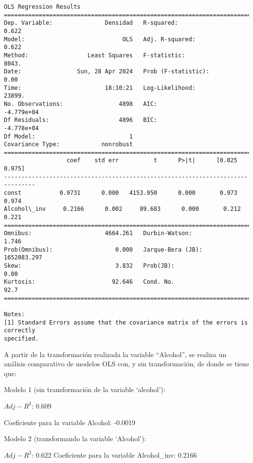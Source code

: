 \documentclass[11pt]{article}
\begin{document}
    \begin{Verbatim}[commandchars=\\\{\}]
                            OLS Regression Results
==============================================================================
Dep. Variable:               Densidad   R-squared:                       0.622
Model:                            OLS   Adj. R-squared:                  0.622
Method:                 Least Squares   F-statistic:                     8043.
Date:                Sun, 28 Apr 2024   Prob (F-statistic):               0.00
Time:                        18:10:21   Log-Likelihood:                 23899.
No. Observations:                4898   AIC:                        -4.779e+04
Df Residuals:                    4896   BIC:                        -4.778e+04
Df Model:                           1
Covariance Type:            nonrobust
===============================================================================
                  coef    std err          t      P>|t|      [0.025      0.975]
-------------------------------------------------------------------------------
const           0.9731      0.000   4153.950      0.000       0.973       0.974
Alcohol\_inv     0.2166      0.002     89.683      0.000       0.212       0.221
==============================================================================
Omnibus:                     4664.261   Durbin-Watson:                   1.746
Prob(Omnibus):                  0.000   Jarque-Bera (JB):          1652083.297
Skew:                           3.832   Prob(JB):                         0.00
Kurtosis:                      92.646   Cond. No.                         92.7
==============================================================================

Notes:
[1] Standard Errors assume that the covariance matrix of the errors is correctly
specified.
    \end{Verbatim}

    A partir de la transformación realizada la variable ``Alcohol'', se
realiza un análisis comparativo de modelos OLS con, y sin
transformación, de donde se tiene que:

Modelo 1 (sin transformación de la variable `alcohol'):

\(Adj - R^2\): 0.609

Coeficiente para la variable Alcohol: -0.0019

Modelo 2 (transformando la variable `Alcohol'):

\(Adj - R^2\): 0.622 Coeficiente para la variable Alcohol\_inv: 0.2166
\end{document}

